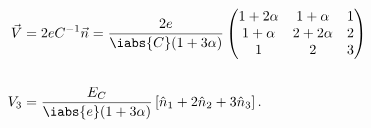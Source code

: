 \begin{equation}
  \label{eq:4jjlinear_4}
  \begin{aligned}
    \vec{V} & = 2eC^{-1}\vec{n} = \frac{2e}{\iabs{C}(1+3\alpha)}\begin{pmatrix}
      1 + 2\alpha & 1 + \alpha & 1 \\
      1 + \alpha & 2 + 2\alpha & 2\\
      1 & 2 & 3
    \end{pmatrix}\\
    &\\
    V_3                     &                      =                     \frac{E_{C}}{\iabs{e}
      (1+3\alpha)}\left[\hat{n}_1+2\hat{n}_{2}+3\hat{n}_{3}\right].
  \end{aligned}

\end{equation}

\noindent
